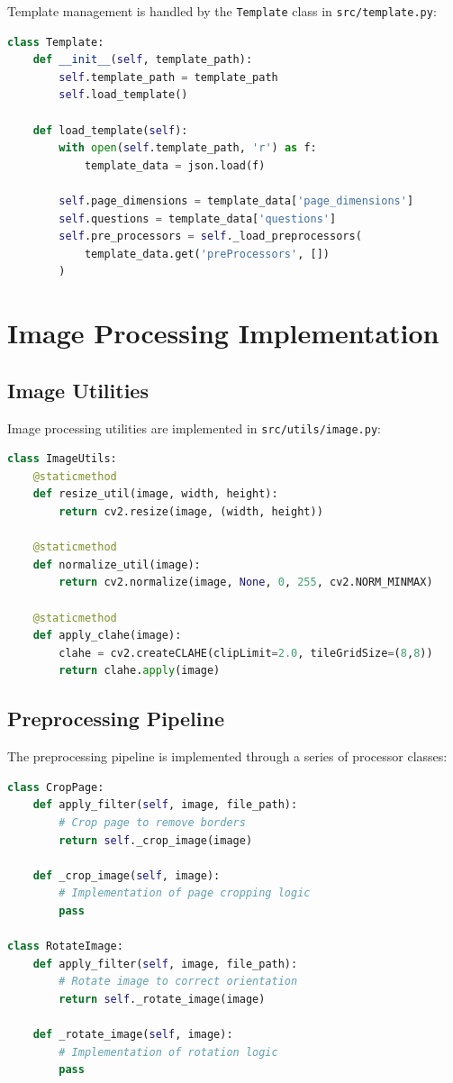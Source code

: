 Template management is handled by the \texttt{Template} class in \texttt{src/template.py}:

\begin{lstlisting}[language=Python, caption=Template Management]
class Template:
    def __init__(self, template_path):
        self.template_path = template_path
        self.load_template()
    
    def load_template(self):
        with open(self.template_path, 'r') as f:
            template_data = json.load(f)
        
        self.page_dimensions = template_data['page_dimensions']
        self.questions = template_data['questions']
        self.pre_processors = self._load_preprocessors(
            template_data.get('preProcessors', [])
        )
\end{lstlisting}

\section{Image Processing Implementation}

\subsection{Image Utilities}

Image processing utilities are implemented in \texttt{src/utils/image.py}:

\begin{lstlisting}[language=Python, caption=Image Processing Utilities]
class ImageUtils:
    @staticmethod
    def resize_util(image, width, height):
        return cv2.resize(image, (width, height))
    
    @staticmethod
    def normalize_util(image):
        return cv2.normalize(image, None, 0, 255, cv2.NORM_MINMAX)
    
    @staticmethod
    def apply_clahe(image):
        clahe = cv2.createCLAHE(clipLimit=2.0, tileGridSize=(8,8))
        return clahe.apply(image)
\end{lstlisting}

\subsection{Preprocessing Pipeline}

The preprocessing pipeline is implemented through a series of processor classes:

\begin{lstlisting}[language=Python, caption=Preprocessing Pipeline]
class CropPage:
    def apply_filter(self, image, file_path):
        # Crop page to remove borders
        return self._crop_image(image)
    
    def _crop_image(self, image):
        # Implementation of page cropping logic
        pass

class RotateImage:
    def apply_filter(self, image, file_path):
        # Rotate image to correct orientation
        return self._rotate_image(image)
    
    def _rotate_image(self, image):
        # Implementation of rotation logic
        pass
\end{lstlisting}

